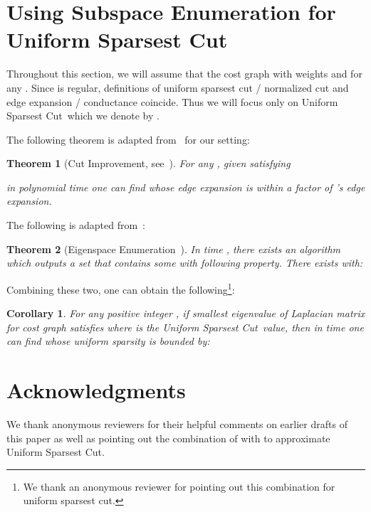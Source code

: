 \documentclass{article}
\newtheorem{theorem}{Theorem}[section]
\newtheorem{corollary}{Corollary}[section]
\newcommand{\usc}{\textsc{\sf Uniform Sparsest Cut}}
\newcounter{alg-count}
\def\ngap{}
\renewcommand{\usc}{{\sc Uniform Sparsest Cut}}
\newcommand{\vnote}[1]{}
\newcommand{\aknote}[1]{}
\begin{document}
\section{Using Subspace Enumeration for \usc}
\label{apx:rse}
\vnote{Should we acknowledge the reviewer here again?} \aknote{Done.}
Throughout this section, we will assume that the cost graph with
weights  and  for any
. Since  is regular, definitions of uniform sparsest cut / normalized
cut and edge expansion / conductance coincide. Thus we will focus only
on \usc\ which we denote by .

\def\uscopt{\phi^\ast} The following theorem is adapted
from~\cite{al08} for our setting:
\begin{theorem}[Cut Improvement, see~\cite{al08}]
  For any , given 
  satisfying
 
in polynomial time one can find  whose edge
expansion is within a factor  of 's edge expansion.
\end{theorem}
\vnote{What happened to the proof you wrote for this?}  \aknote{I only
  had proof of corollary, which is commented out. Do you want to put
  it back?}  The following is adapted from~\cite{ABS}:
\begin{theorem}[Eigenspace Enumeration~\cite{ABS}]
  In time , there exists an algorithm which outputs
  a set  that contains some  with
  following property.  There exists  with:

\end{theorem}
Combining these two, one can obtain the following\footnote{We thank an
  anonymous reviewer for pointing out this combination for uniform
  sparsest cut.}:
\begin{corollary} For any positive integer , if  smallest eigenvalue of
  Laplacian matrix for cost graph satisfies 
  where  is the \usc\ value, then in time  one can find  whose uniform sparsity is
  bounded by:
  
\end{corollary}
\iffalse
\begin{proof}
  Let  be a uniform sparsest cut with sparsity  having
  .  Then we can find a vector
   using eigenspace enumeration such that:
   where .

  Similarly, complement of , , satisfies:
  
  Therefore
   We apply cut improvement algorithm to  if , and to  otherwise.  Without loss of generality,
  let's assume . Then cut improvement finds
   such that:
   Substituting the expression for  completes the proof.
\end{proof}
\fi \ngap
\section*{Acknowledgments}
We thank anonymous reviewers for their helpful comments on earlier
drafts of this paper as well as pointing out the combination of
\cite{al08} with \cite{ABS} to approximate \usc.


\end{document}
